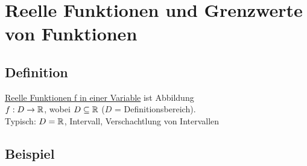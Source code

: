 \section[Funktionen und Grenzwerte]{Reelle Funktionen und Grenzwerte von Funktionen}
\subsection{Definition}
\underline{Reelle Funktionen f in einer Variable} ist Abbildung\\
$ f : D \rightarrow \mathbb{R}$, wobei $D \subseteq \mathbb{R} $ ($D$ = Definitionsbereich).\\
Typisch: $ D = \mathbb{R}$, Intervall, Verschachtlung von Intervallen
\subsection{Beispiel}
